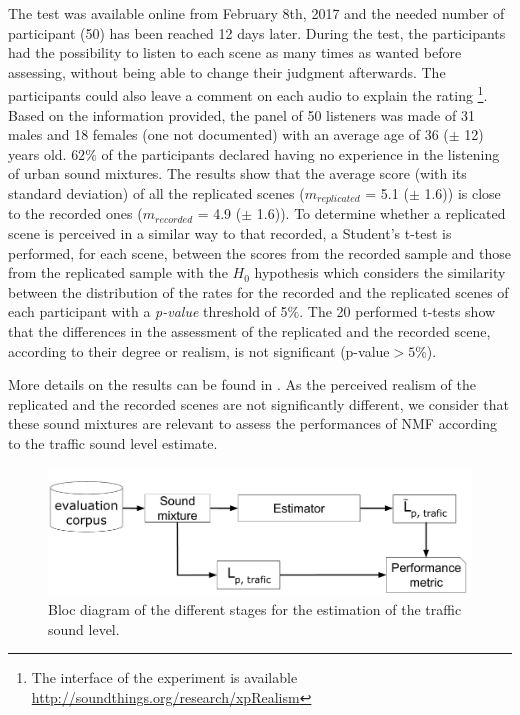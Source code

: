 \documentclass[review,5p,twocolumn,sort&compress,times]{elsarticle}
\begin{document}
The test was available online from February 8th, 2017 and the needed number of participant (50) has been reached 12 days later. During the test, the participants had the possibility to listen to each scene as many times as wanted before assessing, without being able to change their judgment afterwards. The participants could also leave a comment on each audio to explain the rating \footnote{The interface of the experiment is available \url{http://soundthings.org/research/xpRealism}}. Based on the information provided, the panel of 50 listeners was made of 31 males and 18 females (one not documented) with an average age of 36 ($\pm$ 12) years old. $62\%$ of the participants declared having no experience in the listening of urban sound mixtures. 
The results show that the average score (with its standard deviation) of all the replicated scenes ($m_{replicated}$ = 5.1 ($\pm$ 1.6)) is close to the recorded ones ($m_{recorded}$ = 4.9 ($\pm$ 1.6)). To determine whether a replicated scene is perceived in a similar way to that recorded, a Student's t-test is performed, for each scene, between the scores from the recorded sample and those from the replicated sample with the $H_0$ hypothesis which considers the similarity between the distribution of the rates for the recorded and the replicated scenes of each participant with a \textit{p-value} threshold of 5$\%$.  The 20 performed t-tests show that the differences in the assessment of the replicated and the recorded scene, according to their degree or realism, is not significant (p-value$>5\%$).

More details on the results can be found in  \cite{gloaguen_creation_2017}. As the perceived realism of the replicated and the recorded scenes are not significantly different, we consider that  these sound mixtures are relevant to assess the performances of NMF according to the traffic sound level estimate.

\begin{figure}[t]
\centering
\includegraphics[width=0.7\linewidth]{figures/bloc_diagram_estimator.pdf}
\caption{Bloc diagram of the different stages for the estimation of the traffic sound level.}
\label{fig:bloc_diagram_estimator}
\end{figure}
\end{document}
